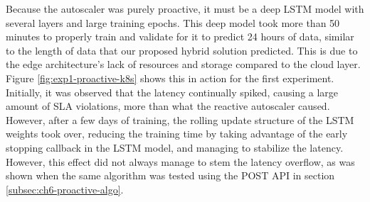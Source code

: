 \begin{center}
\begin{minipage}{\linewidth}
    \label{fig:exp1-proactive-k8s}
\end{minipage}
\end{center}

Because the autoscaler was purely proactive, it must be a deep LSTM model with several layers and large training epochs. This deep model took more than 50 minutes to properly train and validate for it to predict 24 hours of data, similar to the length of data that our proposed hybrid solution predicted. This is due to the edge architecture's lack of resources and storage compared to the cloud layer. Figure \ref{fig:exp1-proactive-k8s} shows this in action for the first experiment. Initially, it was observed that the latency continually spiked, causing a large amount of SLA violations, more than what the reactive autoscaler caused. However, after a few days of training, the rolling update structure of the LSTM weights took over, reducing the training time by taking advantage of the early stopping callback in the LSTM model, and managing to stabilize the latency. However, this effect did not always manage to stem the latency overflow, as was shown when the same algorithm was tested using the POST API in section \ref{subsec:ch6-proactive-algo}.

